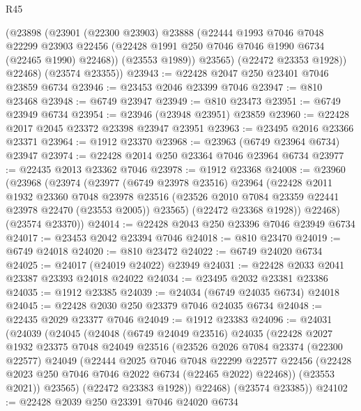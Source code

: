 \begin{lexlean}{R45}
\begin{coremodule}
{          (@23898
            (@23901
              (@22300 @23903)
              @23888
              (@22444
                @1993
                @7046
                @7048
                @22299
                @23903
                @22456
                (@22428 @1991 @250 @7046 @7046 @1990 @6734 (@22465 @1990) @22468))
              (@23553 @1989))
            @23565)
          (@22472 @23353 @1928))
        @22468)
      (@23574 @23355))
@23943 := @22428 @2047 @250 @23401 @7046 @23859 @6734
@23946 := @23453 @2046 @23399 @7046
@23947 := @810 @23468
@23948 := @6749 @23947
@23949 := @810 @23473
@23951 := @6749 @23949 @6734
@23954 := @23946 (@23948 @23951) @23859
@23960 := @22428 @2017 @2045 @23372 @23398 @23947 @23951
@23963 := @23495 @2016 @23366 @23371
@23964 := @1912 @23370
@23968 := @23963 (@6749 @23964 @6734) @23947
@23974 := @22428 @2014 @250 @23364 @7046 @23964 @6734
@23977 := @22435 @2013 @23362 @7046
@23978 := @1912 @23368
@24008 := @23960
    (@23968
      (@23974
        (@23977
          (@6749 @23978 @23516)
          @23964
          (@22428
            @2011
            @1932
            @23360
            @7048
            @23978
            @23516
            (@23526 @2010 @7084 @23359 @22441 @23978 @22470 (@23553 @2005))
            @23565)
          (@22472 @23368 @1928))
        @22468)
      (@23574 @23370))
@24014 := @22428 @2043 @250 @23396 @7046 @23949 @6734
@24017 := @23453 @2042 @23394 @7046
@24018 := @810 @23470
@24019 := @6749 @24018
@24020 := @810 @23472
@24022 := @6749 @24020 @6734
@24025 := @24017 (@24019 @24022) @23949
@24031 := @22428 @2033 @2041 @23387 @23393 @24018 @24022
@24034 := @23495 @2032 @23381 @23386
@24035 := @1912 @23385
@24039 := @24034 (@6749 @24035 @6734) @24018
@24045 := @22428 @2030 @250 @23379 @7046 @24035 @6734
@24048 := @22435 @2029 @23377 @7046
@24049 := @1912 @23383
@24096 := @24031
    (@24039
      (@24045
        (@24048
          (@6749 @24049 @23516)
          @24035
          (@22428
            @2027
            @1932
            @23375
            @7048
            @24049
            @23516
            (@23526
              @2026
              @7084
              @23374
              (@22300 @22577)
              @24049
              (@22444
                @2025
                @7046
                @7048
                @22299
                @22577
                @22456
                (@22428 @2023 @250 @7046 @7046 @2022 @6734 (@22465 @2022) @22468))
              (@23553 @2021))
            @23565)
          (@22472 @23383 @1928))
        @22468)
      (@23574 @23385))
@24102 := @22428 @2039 @250 @23391 @7046 @24020 @6734
}
\end{coremodule}
\end{lexlean}
